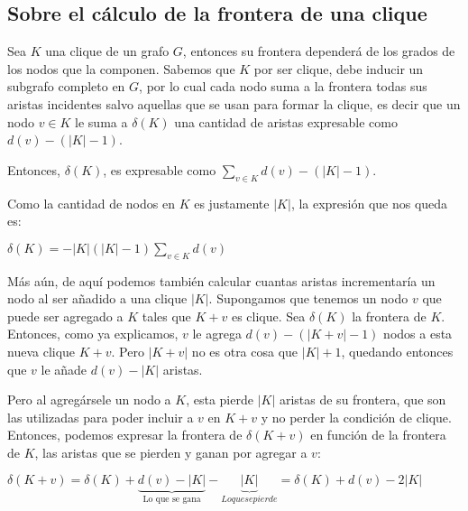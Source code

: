 \subsection*{Sobre el c\'alculo de la frontera de una clique\label{notas:calc_front}}
\par Sea $K$ una clique de un grafo $G$, entonces su frontera depender\'a de los
    grados de los nodos que la componen. Sabemos que $K$ por ser clique, debe inducir
    un subgrafo completo en $G$, por lo cual cada nodo suma a la frontera
    todas sus aristas incidentes salvo aquellas que se usan para formar la
    clique, es decir que un nodo $v \in K$ le suma a $\delta(K)$ una cantidad
    de aristas expresable como $d(v)-(|K|-1)$.

\bigskip
\par Entonces, $\delta(K)$, es expresable como $\displaystyle\sum_{v \in K}d(v) - (|K|-1)$.
\bigskip

\par Como la cantidad de nodos en $K$ es justamente $|K|$, la expresi\'on
    que nos queda es:

\bigskip
\par $\delta(K) = -|K|(|K|-1)\displaystyle\sum_{v \in K}d(v)$
\bigskip

\par M\'as a\'un, de aqu\'i podemos tambi\'en calcular cuantas aristas
    incrementar\'ia un nodo al ser a\~nadido a una clique $|K|$. Supongamos
    que tenemos un nodo $v$ que puede ser agregado a $K$ tales que $K+v$
    es clique. Sea $\delta(K)$ la frontera de $K$. Entonces, como ya explicamos,
    $v$ le agrega $d(v)-(|K+v|-1)$ nodos a esta nueva clique $K+v$. Pero $|K+v|$
    no es otra cosa que $|K|+1$, quedando entonces que $v$ le a\~nade
    $d(v)-|K|$ aristas.

\par Pero al agreg\'arsele un nodo a $K$, esta pierde $|K|$ aristas de su frontera,
    que son las utilizadas para poder incluir a $v$ en $K+v$ y no perder la
    condici\'on de clique. Entonces, podemos expresar la frontera de $\delta(K+v)$
    en funci\'on de la frontera de $K$, las aristas que se pierden y ganan por agregar
    a $v$:

\bigskip

\par $\delta(K+v) = \delta(K) + \underbrace{d(v)-|K|}_{\text{Lo que se gana}}
    - \underbrace{|K|}_{Lo que se pierde} = \delta(K) + d(v) - 2|K|$

{}
